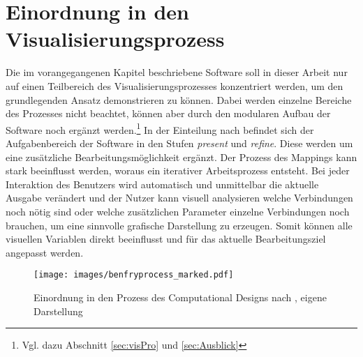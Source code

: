 \documentclass[a4paper, 12pt, DIV=calc, version=first, pdftex, headsepline, footsepline, bibtotocnumbered, liststotocnumbered]{scrreprt}
\begin{document}
\section{Einordnung in den Visualisierungsprozess}
\label{sec:Einordnung}

Die im vorangegangenen Kapitel beschriebene Software soll in dieser Arbeit nur auf einen Teilbereich
des Visualisierungsprozesses konzentriert werden, um den grundlegenden Ansatz demonstrieren zu können. Dabei werden
einzelne Bereiche des Prozesses nicht beachtet, können aber durch den modularen Aufbau der Software
noch ergänzt werden.\footnote{Vgl. dazu Abschnitt \ref{sec:visPro} und \ref{sec:Ausblick}} In der
Einteilung nach \citep{BenFry} befindet sich der Aufgabenbereich der Software in den
Stufen \textit{present} und \textit{refine}. Diese werden um eine zusätzliche Bearbeitungsmöglichkeit ergänzt.
Der Prozess des Mappings kann stark beeinflusst werden, woraus ein iterativer Arbeitsprozess entsteht.
Bei jeder Interaktion des Benutzers wird automatisch und unmittelbar die
aktuelle Ausgabe verändert und der Nutzer kann visuell analysieren welche Verbindungen noch nötig sind
oder welche zusätzlichen Parameter einzelne Verbindungen noch brauchen, um eine sinnvolle grafische 
Darstellung zu erzeugen.
Somit können alle visuellen Variablen direkt beeinflusst und für das aktuelle Bearbeitungsziel angepasst
werden.
\begin{figure}
\centering
\texttt{[image: images/benfryprocess\_marked.pdf]}
\caption{Einordnung in den Prozess des Computational Designs nach \citep{BenFry}, eigene Darstellung}
\label{fig:benfryprocess_marked}
\end{figure}
\end{document}
